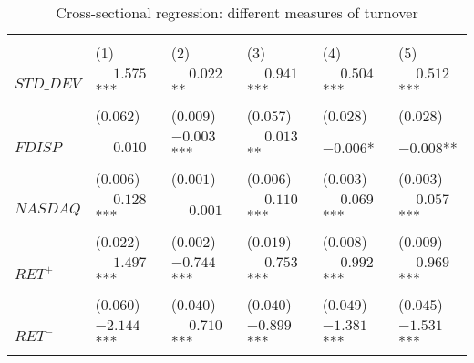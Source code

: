 \begin{table}

\caption[Regression: Different Measures of Turnover]{\label{tab:reg_compact_diff_turn_old}Cross-sectional regression: different measures of turnover}
\centering
\fontsize{9}{11}\selectfont
\begin{threeparttable}
\begin{tabular}[t]{>{\raggedright\arraybackslash}p{3.1cm}>{\raggedright\arraybackslash}p{2cm}>{\raggedright\arraybackslash}p{2cm}>{\raggedright\arraybackslash}p{2cm}>{\raggedright\arraybackslash}p{2cm}>{\raggedright\arraybackslash}p{2cm}}
\toprule
\multicolumn{1}{c}{ } & \multicolumn{1}{c}{$L\_TURN$} & \multicolumn{1}{c}{$\Delta L\_TURN$} & \multicolumn{1}{c}{$L\_TURN\_GRT$} & \multicolumn{1}{c}{$VW\_L\_TURN$} & \multicolumn{1}{c}{$EW\_L\_TURN$} \\
\cmidrule(l{3pt}r{3pt}){2-2} \cmidrule(l{3pt}r{3pt}){3-3} \cmidrule(l{3pt}r{3pt}){4-4} \cmidrule(l{3pt}r{3pt}){5-5} \cmidrule(l{3pt}r{3pt}){6-6}
 & \phantom{-}(1) & \phantom{-}(2) & \phantom{-}(3) & \phantom{-}(4) & \phantom{-}(5)\\
\midrule
$STD\_DEV$ & $\phantom{-}1.575$*** & $\phantom{-}0.022$** & $\phantom{-}0.941$*** & $\phantom{-}0.504$*** & $\phantom{-}0.512$***\\
 & (\phantom{-}$0.062$) & (\phantom{-}$0.009$) & (\phantom{-}$0.057$) & (\phantom{-}$0.028$) & (\phantom{-}$0.028$)\\
\addlinespace
$FDISP$ & $\phantom{-}0.010$ & $-0.003$*** & $\phantom{-}0.013$** & $-0.006$* & $-0.008$**\\
 & (\phantom{-}$0.006$) & (\phantom{-}$0.001$) & (\phantom{-}$0.006$) & (\phantom{-}$0.003$) & (\phantom{-}$0.003$)\\
\addlinespace
$NASDAQ$ & $\phantom{-}0.128$*** & $\phantom{-}0.001$ & $\phantom{-}0.110$*** & $\phantom{-}0.069$*** & $\phantom{-}0.057$***\\
 & (\phantom{-}$0.022$) & (\phantom{-}$0.002$) & (\phantom{-}$0.019$) & (\phantom{-}$0.008$) & (\phantom{-}$0.009$)\\
\addlinespace
$RET^+$ & $\phantom{-}1.497$*** & $-0.744$*** & $\phantom{-}0.753$*** & $\phantom{-}0.992$*** & $\phantom{-}0.969$***\\
 & (\phantom{-}$0.060$) & (\phantom{-}$0.040$) & (\phantom{-}$0.040$) & (\phantom{-}$0.049$) & (\phantom{-}$0.045$)\\
\addlinespace
$RET^-$ & $-2.144$*** & $\phantom{-}0.710$*** & $-0.899$*** & $-1.381$*** & $-1.531$***\\

\end{tabular}
\end{threeparttable}
\end{table}
